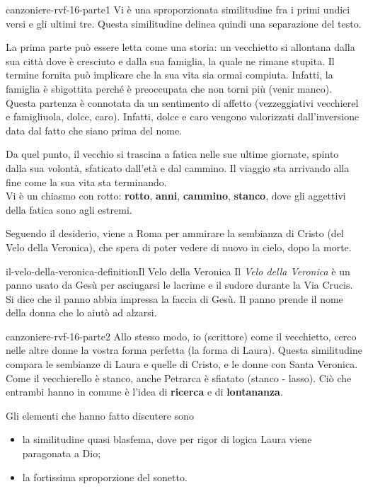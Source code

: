 \documentclass[preview]{standalone}
\begin{document}
\begin{snippet}{canzoniere-rvf-16-parte1}
    Vi è una sproporzionata similitudine fra i primi undici versi e gli ultimi tre.
    Questa similitudine delinea quindi una separazione del testo.

    La prima parte può essere letta come una storia: un vecchietto si allontana
    dalla sua città dove è cresciuto e dalla sua famiglia, la quale ne rimane stupita.
    Il termine fornita può implicare che la sua vita sia ormai compiuta.
    Infatti, la famiglia è sbigottita perché è preoccupata che non torni più (venir manco).
    Questa partenza è connotata da un sentimento di affetto (vezzeggiativi vecchierel e famigliuola, dolce, caro).
    Infatti, dolce e caro vengono valorizzati dall'inversione data dal fatto che siano prima del nome.

    Da quel punto, il vecchio si trascina a fatica nelle sue ultime giornate,
    spinto dalla sua volontà, sfaticato dall'età e dal cammino.
    Il viaggio sta arrivando alla fine come la sua vita sta terminando.\\
    Vi è un chiasmo con rotto: \textbf{rotto}, \textbf{anni}, \textbf{cammino}, \textbf{stanco},
    dove gli aggettivi della fatica sono agli estremi.

    Seguendo il desiderio, viene a Roma per ammirare la sembianza di Cristo (del Velo della Veronica),
    che spera di poter vedere di nuovo in cielo, dopo la morte.
\end{snippet}

\begin{snippetdefinition}{il-velo-della-veronica-definition}{Il Velo della Veronica}
    Il \textit{Velo della Veronica} è un panno usato da Gesù per asciugarsi le lacrime e il sudore
    durante la Via Crucis.
    Si dice che il panno abbia impressa la faccia di Gesù. Il panno prende il nome della donna che lo aiutò ad alzarsi.
\end{snippetdefinition}

\begin{snippet}{canzoniere-rvf-16-parte2}
    Allo stesso modo, io (scrittore) come il vecchietto, cerco nelle altre donne la vostra forma perfetta
    (la forma di Laura).
    Questa similitudine compara le sembianze di Laura e quelle di Cristo, e le donne con Santa Veronica.
    Come il vecchierello è stanco, anche Petrarca è sfiatato (stanco - lasso).
    Ciò che entrambi hanno in comune è l'idea di \textbf{ricerca} e di \textbf{lontananza}.

    Gli elementi che hanno fatto discutere sono
    \begin{itemize}
        \item la similitudine quasi blasfema, dove per rigor di logica Laura viene paragonata a Dio;
        \item la fortissima sproporzione del sonetto.
    \end{itemize}

\end{snippet}
\end{document}
